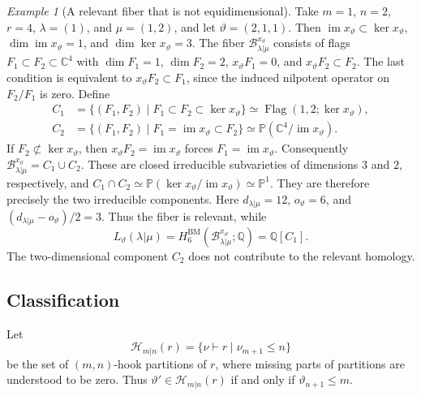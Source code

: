 \documentclass[11pt,a4paper]{amsart}
\theoremstyle{definition}
\theoremstyle{remark}
\newtheorem{example}[theorem]{Example}
\newcommand{\C}{\mathbb C}
\newcommand{\Q}{\mathbb Q}
\newcommand{\BM}{\mathrm{BM}}
\newcommand{\Flag}{\operatorname{Flag}}
\newcommand{\lm}{\lambda|\mu}
\numberwithin{equation}{section}
\begin{document}
\begin{example}[A relevant fiber that is not equidimensional]
\label{ex:relevant-not-equidimensional}
Take $m=1$, $n=2$, $r=4$, $\lambda=(1)$, and $\mu=(1,2)$, and let
$\vartheta=(2,1,1)$. Then
$\operatorname{im}x_\vartheta\subset\ker x_\vartheta$,
$\dim\operatorname{im}x_\vartheta=1$, and $\dim\ker x_\vartheta=3$. The
fiber $\mathcal B_{\lm}^{x_\vartheta}$ consists of flags
$F_1\subset F_2\subset\C^4$ with $\dim F_1=1$, $\dim F_2=2$,
$x_\vartheta F_1=0$, and $x_\vartheta F_2\subset F_2$. The last condition
is equivalent to $x_\vartheta F_2\subset F_1$, since the induced nilpotent
operator on $F_2/F_1$ is zero. Define
$$
\begin{aligned}
C_1&=\{(F_1,F_2)\mid F_1\subset F_2\subset\ker x_\vartheta\}
       \simeq\Flag(1,2;\ker x_\vartheta),\\
C_2&=\{(F_1,F_2)\mid F_1=\operatorname{im}x_\vartheta\subset F_2\}
       \simeq\mathbb P(\C^4/\operatorname{im}x_\vartheta).
\end{aligned}
$$
If $F_2\not\subset\ker x_\vartheta$, then
$x_\vartheta F_2=\operatorname{im}x_\vartheta$ forces
$F_1=\operatorname{im}x_\vartheta$. Consequently
$\mathcal B_{\lm}^{x_\vartheta}=C_1\cup C_2$.
These are closed irreducible subvarieties of dimensions $3$ and $2$,
respectively, and
$C_1\cap C_2\simeq
\mathbb P(\ker x_\vartheta/\operatorname{im}x_\vartheta)\simeq\mathbb P^1$.
They are therefore precisely the two irreducible components.
Here $d_{\lm}=12$, $o_\vartheta=6$, and $(d_{\lm}-o_\vartheta)/2=3$.
Thus the fiber is relevant, while
$$
L_\vartheta(\lm)
=H^{\BM}_6(\mathcal B_{\lm}^{x_\vartheta};\Q)=\Q[C_1].
$$
The two-dimensional component $C_2$ does not contribute to the
relevant homology.
\end{example}

\subsection{Classification}
Let
\begin{equation}\label{eq:geometric-labels}
\mathcal H_{m|n}(r)
=\{\nu\vdash r\mid\nu_{m+1}\leq n\}
\end{equation}
be the set of $(m,n)$-hook partitions of $r$, where missing parts of
partitions are understood to be zero. Thus
$\vartheta'\in\mathcal H_{m|n}(r)$ if and only if $\vartheta_{n+1}\le m$.
\end{document}
